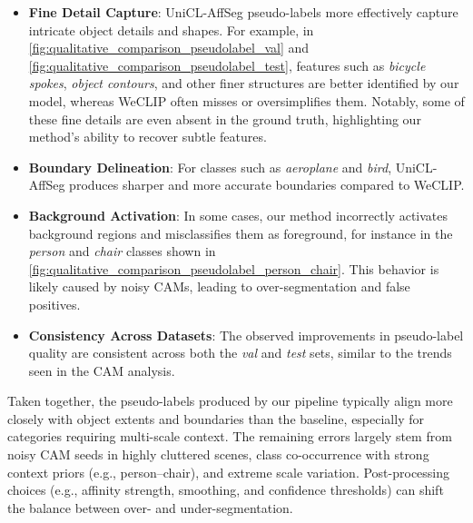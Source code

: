 \begin{itemize}
    \item \textbf{Fine Detail Capture}: UniCL-AffSeg pseudo-labels more effectively capture intricate object details and shapes. For example, in \autoref{fig:qualitative_comparison_pseudolabel_val} and \autoref{fig:qualitative_comparison_pseudolabel_test}, features such as \textit{bicycle spokes}, \textit{object contours}, and other finer structures are better identified by our model, whereas WeCLIP often misses or oversimplifies them. Notably, some of these fine details are even absent in the ground truth, highlighting our method's ability to recover subtle features.
    
    \item \textbf{Boundary Delineation}: For classes such as \textit{aeroplane} and \textit{bird}, UniCL-AffSeg produces sharper and more accurate boundaries compared to WeCLIP.
    
    \item \textbf{Background Activation}: In some cases, our method incorrectly activates background regions and misclassifies them as foreground, for instance in the \textit{person} and \textit{chair} classes shown in \autoref{fig:qualitative_comparison_pseudolabel_person_chair}. This behavior is likely caused by noisy CAMs, leading to over-segmentation and false positives.
    
    \item \textbf{Consistency Across Datasets}: The observed improvements in pseudo-label quality are consistent across both the \textit{val} and \textit{test} sets, similar to the trends seen in the CAM analysis.
\end{itemize}

Taken together, the pseudo-labels produced by our pipeline typically align more closely with object extents and boundaries than the baseline, especially for categories requiring multi-scale context. The remaining errors largely stem from noisy CAM seeds in highly cluttered scenes, class co-occurrence with strong context priors (e.g., person–chair), and extreme scale variation. Post-processing choices (e.g., affinity strength, smoothing, and confidence thresholds) can shift the balance between over- and under-segmentation.

